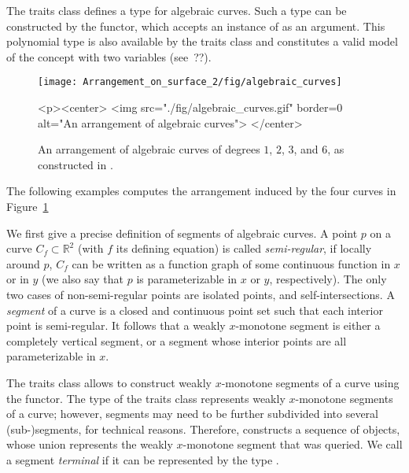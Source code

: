 The traits class defines a type  for algebraic curves.
Such a type can be constructed by the  functor,
which accepts an instance of  as an argument.
This polynomial type is also available by the traits class 
and constitutes a valid model
of the concept  with two variables (see~??).

\begin{figure}[t]
\begin{ccTexOnly}
  \begin{center}
  \texttt{[image: Arrangement\_on\_surface\_2/fig/algebraic\_curves]}
  \end{center}
\end{ccTexOnly}
\begin{ccHtmlOnly}
  <p><center>
  <img src="./fig/algebraic_curves.gif" border=0 alt="An arrangement of algebraic curves">
  </center>
\end{ccHtmlOnly}
\caption{An arrangement of algebraic curves of degrees $1$, $2$, $3$, and $6$,
as constructed in .\label{arr_fig:ex_alg_curves}}
\end{figure}

The following examples computes the arrangement induced by the four curves
in Figure~\ref{arr_fig:ex_alg_curves}


We first give a precise definition of segments of algebraic curves.
A point $p$ on a curve $C_f\subset\mathbb{R}^2$ 
(with $f$ its defining equation) is called
\emph{semi-regular}, if locally around $p$, $C_f$ can be written as
a function graph of some continuous function in $x$ or in $y$
(we also say that $p$ is parameterizable in $x$ or $y$, respectively).
The only two cases of non-semi-regular points are isolated points, and
self-intersections. 
A \emph{segment} of a curve is a closed and continuous point set 
such that each interior point is semi-regular.
It follows that a weakly $x$-monotone segment is either a completely vertical
segment, or a segment whose interior points are all parameterizable in $x$.

The traits class allows to construct weakly $x$-monotone segments of a curve
using the  functor.
The  type of the traits class represents
weakly $x$-monotone segments of a curve; however,
segments may need to be further subdivided into several (sub-)segments,
for technical reasons. Therefore, 
constructs a sequence of  objects, whose union
represents the weakly $x$-monotone segment that was queried.
We call a segment \emph{terminal} if it can be represented
by the type .

